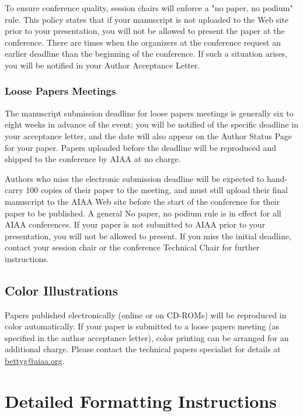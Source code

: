 \documentclass{aiaa-tc}%
\begin{document}
To ensure conference quality, session chairs will enforce a "no paper,
no podium" rule. This policy states that if your manuscript is not
uploaded to the Web site prior to your presentation, you will not be
allowed to present the paper at the conference. There are times when the
organizers at the conference request an earlier deadline than the beginning
of the conference. If such a situation arises, you will be notified in your
Author Acceptance Letter.

\subsubsection{Loose Papers Meetings}

The manuscript submission deadline for loose papers meetings is generally
six to eight weeks in advance of the event; you will be notified of the specific
deadline in your acceptance letter, and the date will also appear on the
Author Status Page for your paper. Papers uploaded before the deadline
will be reproduced and shipped to the conference by AIAA at no charge.

Authors who miss the electronic submission deadline will be expected to
hand-carry 100 copies of their paper to the meeting, and must still upload
their final manuscript to the AIAA Web site before the start of the conference
for their paper to be published. A general No paper, no podium rule is in
effect for all AIAA conferences. If your paper is not submitted to AIAA prior to
your presentation, you will not be allowed to present. If you miss the initial
deadline, contact your session chair or the conference Technical Chair for
further instructions.

\subsection{Color Illustrations}

Papers published electronically (online or on CD-ROMs) will be
reproduced in color automatically. If your paper is submitted to a loose
papers meeting (as specified in the author acceptance letter), color
printing can be arranged for an additional charge. Please contact the
technical papers specialist for details at 
\href{mailto:bettyg@aiaa.org?subject=illustrations}%
        {bettyg@aiaa.org}.

\section{Detailed Formatting Instructions}
\end{document}
